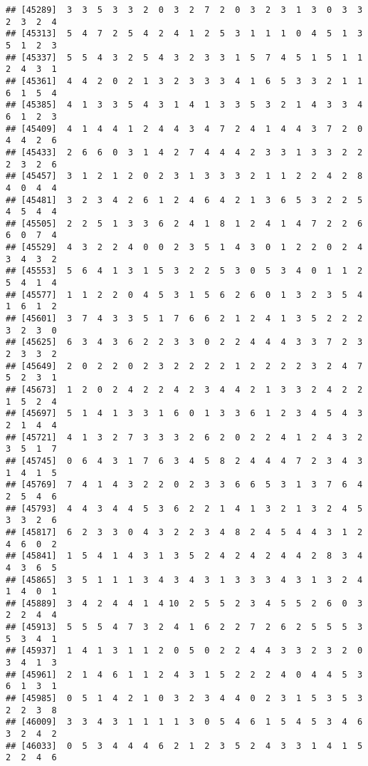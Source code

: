 \documentclass[
]{article}
\begin{document}
\begin{verbatim}
## [45289]  3  3  5  3  3  2  0  3  2  7  2  0  3  2  3  1  3  0  3  3  2  3  2  4
## [45313]  5  4  7  2  5  4  2  4  1  2  5  3  1  1  1  0  4  5  1  3  5  1  2  3
## [45337]  5  5  4  3  2  5  4  3  2  3  3  1  5  7  4  5  1  5  1  1  2  4  3  1
## [45361]  4  4  2  0  2  1  3  2  3  3  3  4  1  6  5  3  3  2  1  1  6  1  5  4
## [45385]  4  1  3  3  5  4  3  1  4  1  3  3  5  3  2  1  4  3  3  4  6  1  2  3
## [45409]  4  1  4  4  1  2  4  4  3  4  7  2  4  1  4  4  3  7  2  0  4  4  2  6
## [45433]  2  6  6  0  3  1  4  2  7  4  4  4  2  3  3  1  3  3  2  2  2  3  2  6
## [45457]  3  1  2  1  2  0  2  3  1  3  3  3  2  1  1  2  2  4  2  8  4  0  4  4
## [45481]  3  2  3  4  2  6  1  2  4  6  4  2  1  3  6  5  3  2  2  5  4  5  4  4
## [45505]  2  2  5  1  3  3  6  2  4  1  8  1  2  4  1  4  7  2  2  6  6  0  7  4
## [45529]  4  3  2  2  4  0  0  2  3  5  1  4  3  0  1  2  2  0  2  4  3  4  3  2
## [45553]  5  6  4  1  3  1  5  3  2  2  5  3  0  5  3  4  0  1  1  2  5  4  1  4
## [45577]  1  1  2  2  0  4  5  3  1  5  6  2  6  0  1  3  2  3  5  4  1  6  1  2
## [45601]  3  7  4  3  3  5  1  7  6  6  2  1  2  4  1  3  5  2  2  2  3  2  3  0
## [45625]  6  3  4  3  6  2  2  3  3  0  2  2  4  4  4  3  3  7  2  3  2  3  3  2
## [45649]  2  0  2  2  0  2  3  2  2  2  2  1  2  2  2  2  3  2  4  7  5  2  3  1
## [45673]  1  2  0  2  4  2  2  4  2  3  4  4  2  1  3  3  2  4  2  2  1  5  2  4
## [45697]  5  1  4  1  3  3  1  6  0  1  3  3  6  1  2  3  4  5  4  3  2  1  4  4
## [45721]  4  1  3  2  7  3  3  3  2  6  2  0  2  2  4  1  2  4  3  2  3  5  1  7
## [45745]  0  6  4  3  1  7  6  3  4  5  8  2  4  4  4  7  2  3  4  3  1  4  1  5
## [45769]  7  4  1  4  3  2  2  0  2  3  3  6  6  5  3  1  3  7  6  4  2  5  4  6
## [45793]  4  4  3  4  4  5  3  6  2  2  1  4  1  3  2  1  3  2  4  5  3  3  2  6
## [45817]  6  2  3  3  0  4  3  2  2  3  4  8  2  4  5  4  4  3  1  2  4  6  0  2
## [45841]  1  5  4  1  4  3  1  3  5  2  4  2  4  2  4  4  2  8  3  4  4  3  6  5
## [45865]  3  5  1  1  1  3  4  3  4  3  1  3  3  3  4  3  1  3  2  4  1  4  0  1
## [45889]  3  4  2  4  4  1  4 10  2  5  5  2  3  4  5  5  2  6  0  3  2  2  4  4
## [45913]  5  5  5  4  7  3  2  4  1  6  2  2  7  2  6  2  5  5  5  3  5  3  4  1
## [45937]  1  4  1  3  1  1  2  0  5  0  2  2  4  4  3  3  2  3  2  0  3  4  1  3
## [45961]  2  1  4  6  1  1  2  4  3  1  5  2  2  2  4  0  4  4  5  3  6  1  3  1
## [45985]  0  5  1  4  2  1  0  3  2  3  4  4  0  2  3  1  5  3  5  3  2  2  3  8
## [46009]  3  3  4  3  1  1  1  1  3  0  5  4  6  1  5  4  5  3  4  6  3  2  4  2
## [46033]  0  5  3  4  4  4  6  2  1  2  3  5  2  4  3  3  1  4  1  5  2  2  4  6

\end{verbatim}
\end{document}
